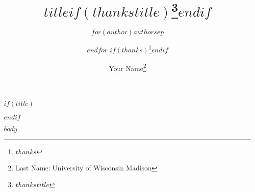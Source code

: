 \documentclass[12pt]{article}
\theoremstyle{plain}
\begin{document}
$if(title)$
\title{$title$$if(thankstitle)$\thanks{$thankstitle$}$endif$}
$endif$
\author{$for(author)$$author$$sep$ \and $endfor$ $if(thanks)$\thanks{$thanks$}$endif$}
\author{Your Name\thanks{Last Name: University of Wisconsin Madison}}

\maketitle

\vspace{-.3in}

$body$
\end{document}
